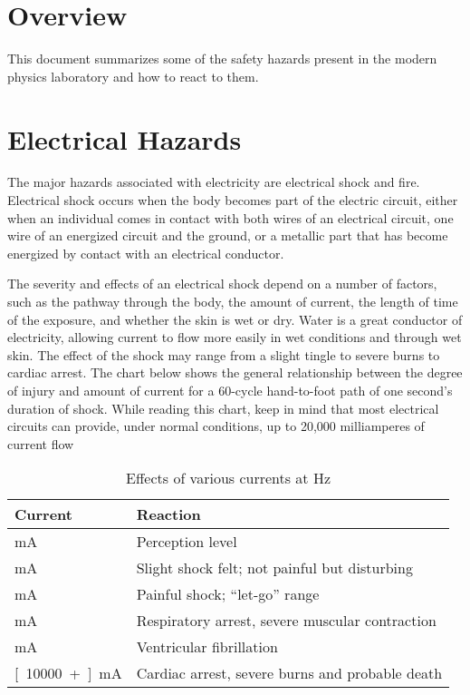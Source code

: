 \section{Overview}
This document summarizes some of the safety hazards present in the modern
physics laboratory and how to react to them. 


\section{Electrical Hazards}\label{sec:electrical-hazards}
The major hazards associated with electricity are electrical shock and fire. Electrical shock occurs when the body becomes part of the electric circuit, either when an individual comes in contact with both wires of an electrical circuit, one wire of an energized circuit and the ground, or a metallic part that has become energized by contact with an electrical conductor.

The severity and effects of an electrical shock depend on a number of factors, such as the pathway through the body, the amount of current, the length of time of the exposure, and whether the skin is wet or dry. Water is a great conductor of electricity, allowing current to flow more easily in wet conditions and through wet skin. The effect of the shock may range from a slight tingle to severe burns to cardiac arrest. The chart below shows the general relationship between the degree of injury and amount of current for a 60-cycle hand-to-foot path of one second's duration of shock. While reading this chart, keep in mind that most electrical circuits can provide, under normal conditions, up to 20,000 milliamperes of current flow 
\begin{table}[ht]
  \centering
  \selectfont
  \begin{tabular}{ll}
    \toprule
    Current & Reaction \\
    \midrule
    \unit[1]{mA} & Perception level \\
    \unit[5]{mA} & Slight shock felt; not painful but disturbing \\
    \unit[6-30]{mA} & Painful shock; ``let-go'' range \\
    \unit[50-150]{mA} & Respiratory arrest, severe muscular contraction \\
    \unit[1000-4300]{mA} & Ventricular fibrillation\\
    \unit[10000+]{mA} & Cardiac arrest, severe burns and probable death \\
    \bottomrule
  \end{tabular}
  \caption{Effects of various currents at \unit[60]{Hz} }
  \label{tab:normaltab}
\end{table}
